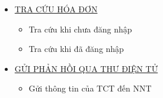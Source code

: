 \begin{itemize}
\item \underline{\textsc{TRA CỨU HÓA ĐƠN}}

\begin{itemize}

\item Tra cứu khi chưa đăng nhập

\item Tra cứu khi đã đăng nhập

\end{itemize}

\item \underline{\textsc{GỬI PHẢN HỒI QUA THƯ ĐIỆN TỬ}}

\begin{itemize}

\item Gửi thông tin của TCT đến NNT

\end{itemize}

\end{itemize}